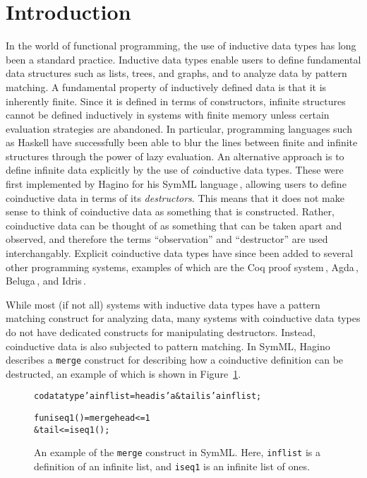 \section{Introduction}
\label{sec:introduction}

In the world of functional programming, the use of inductive data types has long been a standard practice. Inductive data types enable users to define fundamental data structures such as lists, trees, and graphs, and to analyze data by pattern matching. A fundamental property of inductively defined data is that it is inherently finite. Since it is defined in terms of constructors, infinite structures cannot be defined inductively in systems with finite memory unless certain evaluation strategies are abandoned. In particular, programming languages such as Haskell have successfully been able to blur the lines between finite and infinite structures through the power of lazy evaluation. An alternative approach is to define infinite data explicitly by the use of \emph{co}inductive data types. These were first implemented by Hagino for his SymML language\,\citep{Hagino89}, allowing users to define coinductive data in terms of its \emph{destructors}. This means that it does not make sense to think of coinductive data as something that is constructed. Rather, coinductive data can be thought of as something that can be taken apart and observed, and therefore the terms ``observation'' and ``destructor'' are used interchangably. Explicit coinductive data types have since been added to several other programming systems, examples of which are the Coq proof system\,\citep{Coq:manual}, Agda\,\citep{Norell:thesis}, Beluga\,\citep{Pientka10}, and Idris\,\citep{BradyIdrisImpl13}.

While most (if not all) systems with inductive data types have a pattern matching construct for analyzing data, many systems with coinductive data types do not have dedicated constructs for manipulating destructors. Instead, coinductive data is also subjected to pattern matching. In SymML, Hagino describes a \texttt{merge} construct for describing how a coinductive definition can be destructed, an example of which is shown in Figure~\ref{fig:merge_SymML}.

\begin{figure}
\begin{alltt}
codatatype 'a inflist = head is 'a & tail is 'a inflist;

fun iseq1() = merge head <= 1
              & tail <= iseq1();
\end{alltt}
\caption{An example of the \texttt{merge} construct in SymML. Here, \texttt{inflist} is a definition of an infinite list, and \texttt{iseq1} is an infinite list of ones.}
\label{fig:merge_SymML}
\end{figure}

